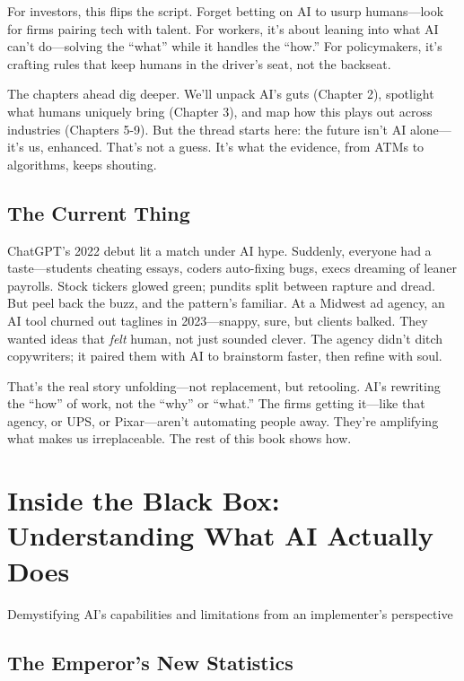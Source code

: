 \documentclass[
  Letterpaper,
]{scrbook}
\begin{document}
For investors, this flips the script. Forget betting on AI to usurp
humans---look for firms pairing tech with talent. For workers, it's
about leaning into what AI can't do---solving the ``what'' while it
handles the ``how.'' For policymakers, it's crafting rules that keep
humans in the driver's seat, not the backseat.

The chapters ahead dig deeper. We'll unpack AI's guts (Chapter 2),
spotlight what humans uniquely bring (Chapter 3), and map how this plays
out across industries (Chapters 5-9). But the thread starts here: the
future isn't AI alone---it's us, enhanced. That's not a guess. It's what
the evidence, from ATMs to algorithms, keeps shouting.

\section{The Current Thing}\label{the-current-thing}

ChatGPT's 2022 debut lit a match under AI hype. Suddenly, everyone had a
taste---students cheating essays, coders auto-fixing bugs, execs
dreaming of leaner payrolls. Stock tickers glowed green; pundits split
between rapture and dread. But peel back the buzz, and the pattern's
familiar. At a Midwest ad agency, an AI tool churned out taglines in
2023---snappy, sure, but clients balked. They wanted ideas that
\emph{felt} human, not just sounded clever. The agency didn't ditch
copywriters; it paired them with AI to brainstorm faster, then refine
with soul.

That's the real story unfolding---not replacement, but retooling. AI's
rewriting the ``how'' of work, not the ``why'' or ``what.'' The firms
getting it---like that agency, or UPS, or Pixar---aren't automating
people away. They're amplifying what makes us irreplaceable. The rest of
this book shows how.


\chapter{Inside the Black Box: Understanding What AI Actually
Does}\label{inside-the-black-box-understanding-what-ai-actually-does}

Demystifying AI's capabilities and limitations from an implementer's
perspective

\hfill\break

\section{The Emperor's New
Statistics}\label{the-emperors-new-statistics}
\end{document}
